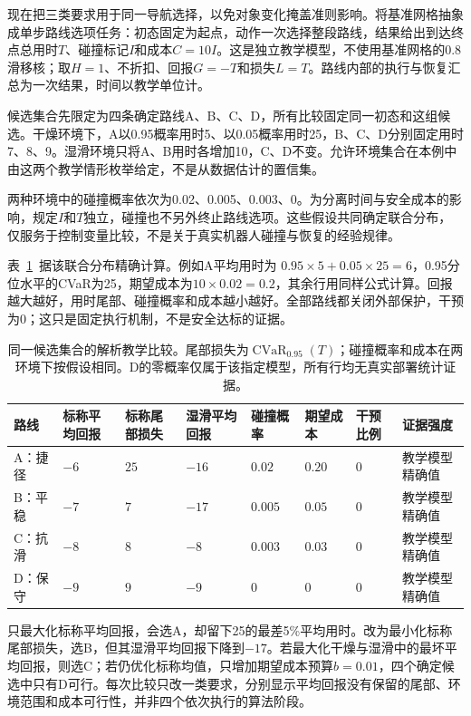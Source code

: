 现在把三类要求用于同一导航选择，以免对象变化掩盖准则影响。将基准网格抽象成单步路线选项任务：初态固定为起点，动作一次选择整段路线，结果给出到达终点总用时$T$、碰撞标记$I$和成本$C=10I$。这是独立教学模型，不使用基准网格的0.8滑移核；取$H=1$、不折扣、回报$G=-T$和损失$L=T$。路线内部的执行与恢复汇总为一次结果，时间以教学单位计。

候选集合先限定为四条确定路线A、B、C、D，所有比较固定同一初态和这组候选。干燥环境下，A以0.95概率用时5、以0.05概率用时25，B、C、D分别固定用时7、8、9。湿滑环境只将A、B用时各增加10，C、D不变。允许环境集合在本例中由这两个教学情形枚举给定，不是从数据估计的置信集。

两种环境中的碰撞概率依次为0.02、0.005、0.003、0。为分离时间与安全成本的影响，规定$I$和$T$独立，碰撞也不另外终止路线选项。这些假设共同确定联合分布，仅服务于控制变量比较，不是关于真实机器人碰撞与恢复的经验规律。

表~\ref{tab:rl-trustworthy-comparison}~据该联合分布精确计算。例如A平均用时为
$0.95\times5+0.05\times25=6$，0.95分位水平的CVaR为25，期望成本为$10\times0.02=0.2$，其余行用同样公式计算。回报越大越好，用时尾部、碰撞概率和成本越小越好。全部路线都关闭外部保护，干预为0；这只是固定执行机制，不是安全达标的证据。

\begin{table}[t]
  \centering
  \begin{tabularx}{\linewidth}{@{}>{\raggedright\arraybackslash}p{14mm}XXXXXXX@{}}
    \toprule
    路线 & 标称平均回报 & 标称尾部损失 & 湿滑平均回报 & 碰撞概率 & 期望成本 & 干预比例 & 证据强度 \\
    \midrule
    A：捷径 & $-6$ & $25$ & $-16$ & $0.02$ & $0.20$ & $0$ & 教学模型精确值 \\
    B：平稳 & $-7$ & $7$ & $-17$ & $0.005$ & $0.05$ & $0$ & 教学模型精确值 \\
    C：抗滑 & $-8$ & $8$ & $-8$ & $0.003$ & $0.03$ & $0$ & 教学模型精确值 \\
    D：保守 & $-9$ & $9$ & $-9$ & $0$ & $0$ & $0$ & 教学模型精确值 \\
    \bottomrule
  \end{tabularx}
  \caption{同一候选集合的解析教学比较。尾部损失为$\operatorname{CVaR}_{0.95}(T)$；碰撞概率和成本在两环境下按假设相同。D的零概率仅属于该指定模型，所有行均无真实部署统计证据。}
  \label{tab:rl-trustworthy-comparison}
\end{table}

只最大化标称平均回报，会选A，却留下25的最差5\%平均用时。改为最小化标称尾部损失，选B，但其湿滑平均回报下降到$-17$。若最大化干燥与湿滑中的最坏平均回报，则选C；若仍优化标称均值，只增加期望成本预算$b=0.01$，四个确定候选中只有D可行。每次比较只改一类要求，分别显示平均回报没有保留的尾部、环境范围和成本可行性，并非四个依次执行的算法阶段。


